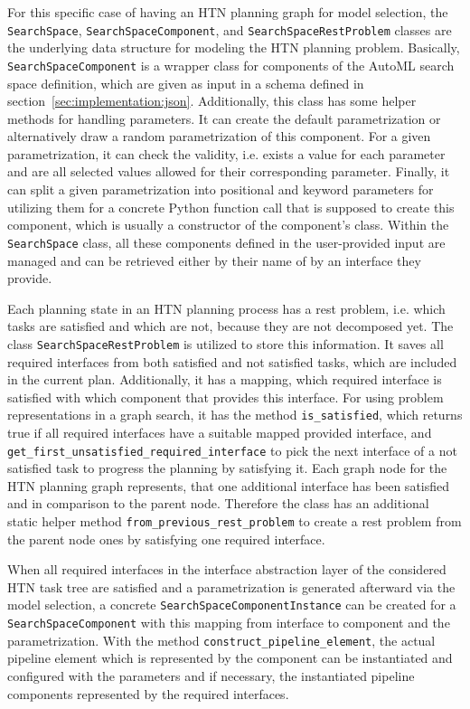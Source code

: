 For this specific case of having an HTN planning graph for model selection, the \texttt{SearchSpace}, \texttt{SearchSpaceComponent}, and \texttt{SearchSpaceRestProblem} classes are the underlying data structure for modeling the HTN planning problem.\newline
Basically, \texttt{SearchSpaceComponent} is a wrapper class for components of the AutoML search space definition, which are given as input in a schema defined in section~\ref{sec:implementation:json}.
Additionally, this class has some helper methods for handling parameters.
It can create the default parametrization or alternatively draw a random parametrization of this component.
For a given parametrization, it can check the validity, i.e. exists a value for each parameter and are all selected values allowed for their corresponding parameter.
Finally, it can split a given parametrization into positional and keyword parameters for utilizing them for a concrete Python function call that is supposed to create this component, which is usually a constructor of the component's class.\newline
Within the \texttt{SearchSpace} class, all these components defined in the user-provided input are managed and can be retrieved either by their name of by an interface they provide.

Each planning state in an HTN planning process has a rest problem, i.e. which tasks are satisfied and which are not, because they are not decomposed yet.
The class \texttt{SearchSpaceRestProblem} is utilized to store this information.
It saves all required interfaces from both satisfied and not satisfied tasks, which are included in the current plan.
Additionally, it has a mapping, which required interface is satisfied with which component that provides this interface.\newline
For using problem representations in a graph search, it has the method \texttt{is\_satisfied}, which returns true if all required interfaces have a suitable mapped provided interface, and \texttt{get\_first\_unsatisfied\_required\_interface} to pick the next interface of a not satisfied task to progress the planning by satisfying it.
Each graph node for the HTN planning graph represents, that one additional interface has been satisfied and in comparison to the parent node.
Therefore the class has an additional static helper method \texttt{from\_previous\_rest\_problem} to create a rest problem from the parent node ones by satisfying one required interface.

When all required interfaces in the interface abstraction layer of the considered HTN task tree are satisfied and a parametrization is generated afterward via the model selection, a concrete \texttt{SearchSpaceComponentInstance} can be created for a \texttt{SearchSpaceComponent} with this mapping from interface to component and the parametrization.
With the method \texttt{construct\_pipeline\_element}, the actual pipeline element which is represented by the component can be instantiated and configured with the parameters and if necessary, the instantiated pipeline components represented by the required interfaces.

